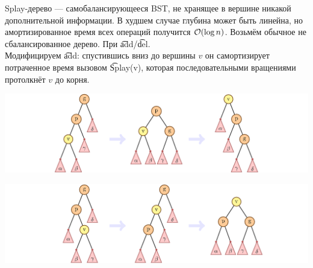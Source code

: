 


Splay-дерево --- самобалансирующееся BST, не хранящее в вершине никакой дополнительной информации.
В худшем случае глубина может быть линейна, но амортизированное время всех операций получится $\mathcal{O}(\log n)$.
Возьмём обычное не сбалансированное дерево. При \t{add}/\t{del}.\\
Модифицируем \t{add}: спустившись вниз до вершины $v$ он самортизирует потраченное время вызовом \t{Splay(v)},
которая последовательными вращениями протолкнёт $v$ до корня.


\vspace*{-2em}
\begin{center}
\includegraphics{pics/zig-zig.png}
\end{center}


\vspace*{-2em}
\begin{center}
\includegraphics{pics/zig-zag.png}
\end{center}

